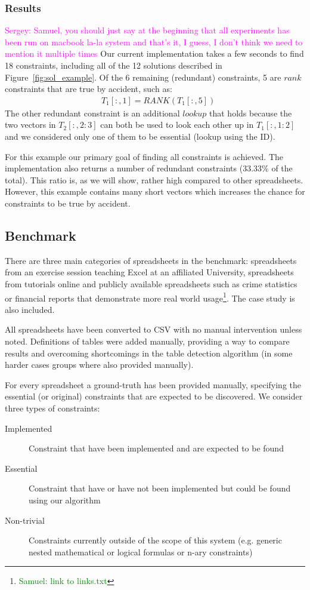 \documentclass{ecai}
\newcommand{\sergey}[1]{\textcolor{magenta}{{\sc Sergey:} #1}\xspace}
\newcommand{\samuel}[1]{\textcolor{green}{{\sc Samuel:} #1}\xspace}
\newcommand{\range}[3]{\ensuremath{#1[#2,#3]}}
\newcommand{\rangeto}[2]{#1{:}#2}
\newcommand{\rangeall}{:}
\newcommand{\eccalc}[2]{\ensuremath{#1 = #2}}
\newcommand{\ecrank}[2]{\eccalc{#1}{\mathit{RANK}(#2)}}
\begin{document}
\subsubsection{Results}
\sergey{Samuel, you should just say at the beginning that all experiments has been run on macbook la-la system and that's it, I guess, I don't think we need to mention it multiple times}
Our current implementation takes a few seconds to find 18 constraints, including all of the 12 solutions described in Figure~\ref{fig:sol_example}.
Of the 6 remaining (redundant) constraints, 5 are $\mathit{rank}$ constraints that are true by accident, such as: \begin{align*}
  & \ecrank{\range{T_1}{\rangeall}{1}}{\range{T_1}{\rangeall}{5}}
\end{align*}
The other redundant constraint is an additional $\mathit{lookup}$ that holds because the two vectors in \range{T_2}{\rangeall}{\rangeto{2}{3}} can both be used to look each other up in \range{T_1}{\rangeall}{\rangeto{1}{2}} and we considered only one of them to be essential (lookup using the ID).

For this example our primary goal of finding all constraints is achieved.
The implementation also returns a number of redundant constraints ($33.33\%$ of the total).
This ratio is, as we will show, rather high compared to other spreadsheets.
However, this example contains many short vectors which increases the chance for constraints to be true by accident.

\subsection{Benchmark}
There are three main categories of spreadsheets in the benchmark: spreadsheets from an exercise session teaching Excel at an affiliated University, spreadsheets from tutorials online and publicly available spreadsheets such as crime statistics or financial reports that demonstrate more real world usage\footnote{\samuel{link to links.txt}}.
The case study is also included.

All spreadsheets have been converted to CSV with no manual intervention unless noted.
Definitions of tables were added manually, providing a way to compare results and overcoming shortcomings in the table detection algorithm (in some harder cases groups where also provided manually).

For every spreadsheet a ground-truth has been provided manually, specifying the essential (or original) constraints that are expected to be discovered.
We consider three types of constraints:
\begin{description}
  \item[Implemented] Constraint that have been implemented and are expected to be found
  \item[Essential] Constraint that have or have not been implemented but could be found using our algorithm
  \item[Non-trivial] Constraints currently outside of the scope of this system (e.g. generic nested mathematical or logical formulas or n-ary constraints)
\end{description}
\end{document}
